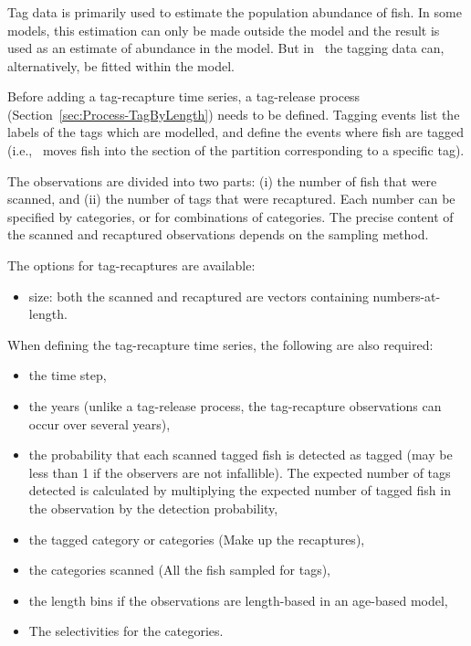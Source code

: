 \subsubsection{} \label{sec:Observation-TagRecaptures} \label{sec:Observation-TagRecaptureByLength}

Tag data is primarily used to estimate the population abundance of fish. In some models, this estimation can only be made outside the model and the result is used as an estimate of abundance in the model. But in \CNAME\ the tagging data can, alternatively, be fitted within the model.

Before adding a tag-recapture time series, a tag-release process (Section~\ref{sec:Process-TagByLength}) needs to be defined. Tagging events list the labels of the tags which are modelled, and define the events where fish are tagged (i.e., \CNAME\ moves fish into the section of the partition corresponding to a specific tag).

The observations are divided into two parts: (i) the number of fish that were scanned, and (ii) the number of tags that were recaptured. Each number can be specified by categories, or for combinations of categories. The precise content of the scanned and recaptured observations depends on the sampling method.

The options for tag-recaptures are available:

\begin{itemize}
	\item size: both the scanned and recaptured are vectors containing numbers-at-length. 
\end{itemize}

When defining the tag-recapture time series, the following are also required:

\begin{itemize}
	\item the time step,
	\item the years (unlike a tag-release process, the tag-recapture observations can occur over several years),
	\item the probability that each scanned tagged fish is detected as tagged (may be less than 1 if the observers are not infallible). The expected number of tags detected is calculated by multiplying the expected number of tagged fish in the observation by the detection probability,
	\item the tagged category or categories (Make up the recaptures),
	\item the categories scanned (All the fish sampled for tags),
	\item the length bins if the observations are length-based in an age-based model,
	\item The selectivities for the categories. 
\end{itemize}

